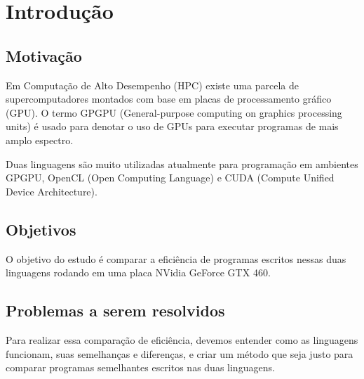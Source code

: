 \section{Introdução}
\subsection{Motivação}
Em Computação de Alto Desempenho (HPC) existe uma parcela de supercomputadores montados com base em placas
de processamento gráfico (GPU). O termo GPGPU (General-purpose computing on graphics processing units) é
usado para denotar o uso de GPUs para executar programas de mais amplo espectro.

Duas linguagens são muito utilizadas atualmente para programação em ambientes GPGPU, OpenCL (Open Computing Language) 
e CUDA (Compute Unified Device Architecture).

\subsection{Objetivos}
O objetivo do estudo é comparar a eficiência de programas escritos nessas duas linguagens rodando em uma placa NVidia GeForce GTX 460.

\subsection{Problemas a serem resolvidos}
Para realizar essa comparação de eficiência, devemos entender como as linguagens funcionam, suas semelhanças e
diferenças, e criar um método que seja justo para comparar programas semelhantes escritos nas duas linguagens.
